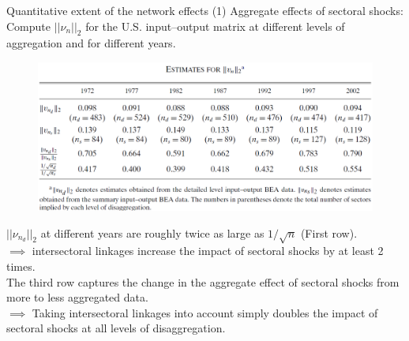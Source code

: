 \documentclass[dvipsnames]{beamer}
\begin{document}
\begin{frame}{Quantitative extent of the network effects (1)}
    \justifying
Aggregate effects of sectoral shocks: Compute $||\nu_{n}||_2$
for the U.S. input–output matrix at different levels of 
aggregation and for different years.

\begin{figure}[H]
    \includegraphics[scale=0.5]{8}
    \centering
\end{figure}  

$||\nu_{n_d}||_2$ at different years
are roughly twice as large as $1/\sqrt{n}$ (First row).\\
$\implies$ intersectoral linkages increase the impact of sectoral 
shocks by at least 2 times.\\[3pt]

The third row captures the change in the aggregate effect of sectoral shocks
from more to less aggregated data.\\
$\implies$ Taking intersectoral linkages into account
simply doubles the impact of sectoral shocks at all levels of disaggregation.
\end{frame}
\end{document}
